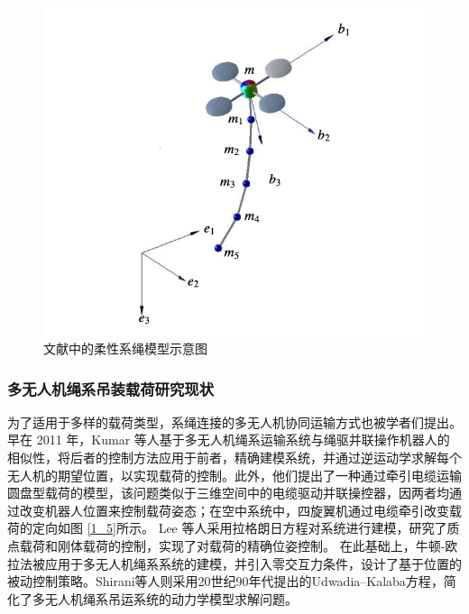 \documentclass[lang=chs, degree=master, blindreview=false, winfonts=true]{yanputhesis}
\begin{document}
\begin{figure}[hbt!]
	\centering
	\includegraphics[width=28pc]{picture/1_4.png} 
	\caption{文献中的柔性系绳模型示意图} \label{1_4}
\end{figure}


\subsubsection{多无人机绳系吊装载荷研究现状}
为了适用于多样的载荷类型，系绳连接的多无人机协同运输方式也被学者们提出。早在 2011 年，Kumar 等人基于多无人机绳系运输系统与绳驱并联操作机器人的相似性，将后者的控制方法应用于前者，精确建模系统，并通过逆运动学求解每个无人机的期望位置，以实现载荷的控制\cite{michael2011cooperative}。此外，他们提出了一种通过牵引电缆运输圆盘型载荷的模型，该问题类似于三维空间中的电缆驱动并联操控器，因两者均通过改变机器人位置来控制载荷姿态；在空中系统中，四旋翼机通过电缆牵引改变载荷的定向如图 \ref{1_5}所示。
Lee 等人采用拉格朗日方程对系统进行建模，研究了质点载荷\cite{lee2013geometric}和刚体载荷\cite{lee2017geometric}的控制，实现了对载荷的精确位姿控制。
在此基础上，牛顿-欧拉法被应用于多无人机绳系系统的建模，并引入零交互力条件，设计了基于位置的被动控制策略\cite{cardona2019cooperative}。Shirani等人则采用20世纪90年代提出的Udwadia–Kalaba方程\cite{udwadia1992new,udwadia1996equations}，简化了多无人机绳系吊运系统的动力学模型求解问题\cite{shirani2019cooperative}。
\end{document}
